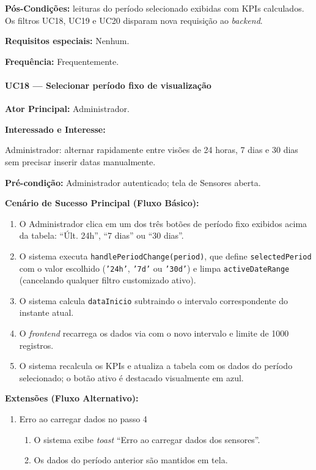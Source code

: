 \textbf{Pós-Condições:} leituras do período selecionado
exibidas com KPIs calculados. Os filtros UC18, UC19 e
UC20 disparam nova requisição ao
\textit{backend}.

\textbf{Requisitos especiais:} Nenhum.

\textbf{Frequência:} Frequentemente.

\paragraph{UC18 --- Selecionar período fixo de visualização}\hfill\break

\textbf{Ator Principal:} Administrador.

\textbf{Interessado e Interesse:}

Administrador: alternar rapidamente entre visões de 24
horas, 7 dias e 30 dias sem precisar inserir datas
manualmente.

\textbf{Pré-condição:} Administrador autenticado; tela de
Sensores aberta.

\textbf{Cenário de Sucesso Principal (Fluxo Básico):}
\begin{enumerate}
  \item O Administrador clica em um dos três botões de
        período fixo exibidos acima da tabela:
        ``Últ. 24h'', ``7 dias'' ou ``30 dias''.
  \item O sistema executa \texttt{handlePeriodChange(period)},
        que define \texttt{selectedPeriod} com o valor
        escolhido (\texttt{'24h'}, \texttt{'7d'} ou
        \texttt{'30d'}) e limpa \texttt{activeDateRange}
        (cancelando qualquer filtro customizado ativo).
  \item O sistema calcula \texttt{dataInicio} subtraindo
        o intervalo correspondente do instante atual.
  \item O \textit{frontend} recarrega os dados via
        com o novo intervalo e limite de 1000 registros.
  \item O sistema recalcula os KPIs e atualiza a tabela
        com os dados do período selecionado; o botão
        ativo é destacado visualmente em azul.
\end{enumerate}

\textbf{Extensões (Fluxo Alternativo):}

\begin{enumerate}
  \renewcommand{\theenumi}{4a}
  \renewcommand{\labelenumi}{\theenumi.}
  \item Erro ao carregar dados no passo 4
  \begin{enumerate}
  \item O sistema exibe \textit{toast}
        ``Erro ao carregar dados dos sensores''.
  \item Os dados do período anterior são mantidos
        em tela.
  \end{enumerate}
\end{enumerate}

